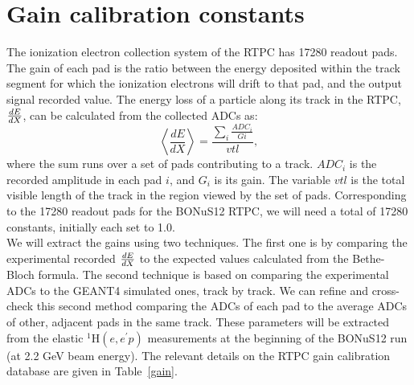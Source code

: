 \documentclass[12pt]{article}
\begin{document}
   \section {Gain calibration constants}
 The ionization electron collection system of the RTPC has 17280 readout pads. 
 The gain of each pad is the ratio between the energy deposited within the 
 track segment for which the ionization electrons will drift to that pad, and 
 the output signal recorded value. The energy loss of a particle along its 
 track in the RTPC, $\small{\frac{dE}{dX}}$, can be calculated from the 
 collected ADCs as: \begin{equation}
 \left\langle \frac{dE}{dX} \right\rangle= \frac{\sum\limits_{i} \frac{ADC_{i}}{Gi}}{vtl},
\end{equation}
where the sum runs over a set of pads contributing to a track. $ADC_{i}$ is the 
recorded amplitude in each pad $i$, and $G_{i}$ is its gain. The variable $vtl$ is the 
      total visible length of the track in the region viewed by the set of 
      pads. Corresponding to the 17280 readout pads for the BONuS12 RTPC, we 
      will need a total of 17280 constants, initially each set to 1.0.
    ~\\

       
We will extract the gains using two techniques. The first 
      one is by comparing the experimental recorded $\small{\frac{dE}{dX}}$ to 
      the expected values calculated from the Bethe-Bloch formula. The second 
      technique is based on comparing the experimental ADCs to the GEANT4 
      simulated ones, track by track. We can refine and cross-check this second 
      method comparing the ADCs of each pad to the average ADCs of other, 
      adjacent pads in the same track. These parameters will be extracted from 
      the elastic $^1$H$(e,e^\prime p)$ measurements at the beginning of the 
      BONuS12 run (at 2.2 GeV beam energy). The relevant details on the RTPC 
      gain calibration database are given in Table~\ref{gain}.
\end{document}
